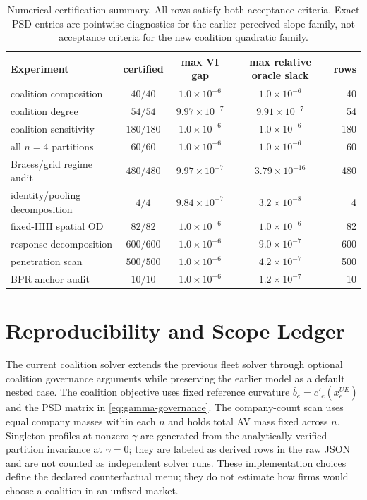 \begin{table}[htbp]
\centering
\scriptsize
\setlength{\tabcolsep}{3pt}
\caption{Numerical certification summary. All rows satisfy both acceptance criteria. Exact PSD entries are pointwise diagnostics for the earlier perceived-slope family, not acceptance criteria for the new coalition quadratic family.}
\label{tab:certificates}
\begin{tabular}{lcccr}
\toprule
Experiment & certified & max VI gap & max relative oracle slack & rows\\
\midrule
coalition composition & $40/40$ & $1.0\times10^{-6}$ & $1.0\times10^{-6}$ & 40\\
coalition degree & $54/54$ & $9.97\times10^{-7}$ & $9.91\times10^{-7}$ & 54\\
coalition sensitivity & $180/180$ & $1.0\times10^{-6}$ & $1.0\times10^{-6}$ & 180\\
all $n=4$ partitions & $60/60$ & $1.0\times10^{-6}$ & $1.0\times10^{-6}$ & 60\\
Braess/grid regime audit & $480/480$ & $9.97\times10^{-7}$ & $3.79\times10^{-16}$ & 480\\
identity/pooling decomposition & $4/4$ & $9.84\times10^{-7}$ & $3.2\times10^{-8}$ & 4\\
fixed-HHI spatial OD & $82/82$ & $1.0\times10^{-6}$ & $1.0\times10^{-6}$ & 82\\
response decomposition & $600/600$ & $1.0\times10^{-6}$ & $9.0\times10^{-7}$ & 600\\
penetration scan & $500/500$ & $1.0\times10^{-6}$ & $4.2\times10^{-7}$ & 500\\
BPR anchor audit & $10/10$ & $1.0\times10^{-6}$ & $1.2\times10^{-7}$ & 10\\
\bottomrule
\end{tabular}
\end{table}

\section{Reproducibility and Scope Ledger}\label{app:reproducibility}

The current coalition solver extends the previous fleet solver through optional coalition governance arguments while preserving the earlier model as a default nested case. The coalition objective uses fixed reference curvature $\bar b_e=c'_e(x_e^{UE})$ and the PSD matrix in \eqref{eq:gamma-governance}. The company-count scan uses equal company masses within each $n$ and holds total AV mass fixed across $n$. Singleton profiles at nonzero $\gamma$ are generated from the analytically verified partition invariance at $\gamma=0$; they are labeled as derived rows in the raw JSON and are not counted as independent solver runs. These implementation choices define the declared counterfactual menu; they do not estimate how firms would choose a coalition in an unfixed market.

